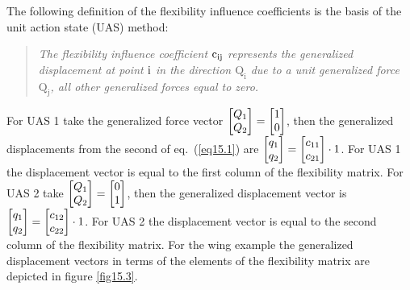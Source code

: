 \documentclass{AeroStructure-ERJohnson}
\begin{document}
The following definition of the flexibility influence coefficients is the basis of the unit action state (UAS) method:

\begin{quote}
\textit{The flexibility influence coefficient ${\rm c}_{\rm ij}$ represents the generalized displacement at point ${\rm i}$ in the direction $\mathrm{Q}_\mathrm{i}$ due to a unit generalized force $\mathrm{Q}_\mathrm{j}$, all other generalized forces equal to zero.}
\end{quote}

For UAS 1 take the generalized force vector $\left[\begin{array}{@{}l@{}}Q_{1} \\Q_{2}\end{array}\right]=\left[\begin{array}{@{}l@{}}1 \\0\end{array}\right]$, then the generalized displacements from the second of eq.~(\ref{eq15.1}) are $\left[\begin{array}{@{}l@{}}q_{1} \\q_{2}\end{array}\right]=\left[\begin{array}{@{}l@{}}c_{11} \\c_{21}\end{array}\right] \cdot 1$. For UAS 1 the displacement vector is equal to the first column of the flexibility matrix. For UAS 2 take $\left[\begin{array}{@{}l@{}}Q_{1} \\Q_{2}\end{array}\right]=\left[\begin{array}{@{}l@{}}0 \\1\end{array}\right]$, then the generalized displacement vector is $\left[\begin{array}{@{}l@{}}q_{1} \\q_{2}\end{array}\right]=\left[\begin{array}{@{}l@{}}c_{12} \\c_{22}\end{array}\right] \cdot 1$. For UAS 2 the displacement vector is equal to the second column of the flexibility matrix. For the wing example the generalized displacement vectors in terms of the elements of the flexibility matrix are depicted in figure \ref{fig15.3}.
\end{document}

